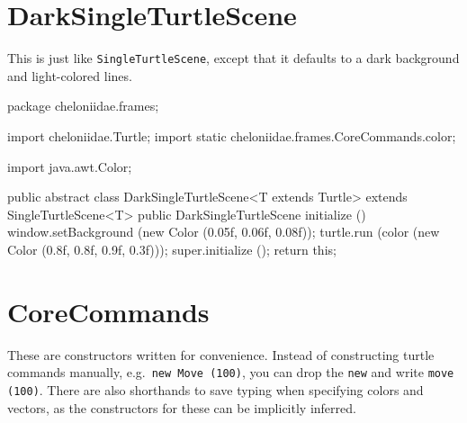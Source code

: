\documentclass{report}
\begin{document}
\section {DarkSingleTurtleScene} \label{sec:darksingleturtlescene}
      This is just like {\tt SingleTurtleScene}, except that it defaults to a dark background and light-colored lines.
  
\begin{javacode}
package cheloniidae.frames;

import cheloniidae.Turtle;
import static cheloniidae.frames.CoreCommands.color;

import java.awt.Color;

public abstract class DarkSingleTurtleScene<T extends Turtle> extends SingleTurtleScene<T> {
  public DarkSingleTurtleScene initialize () {
    window.setBackground (new Color (0.05f, 0.06f, 0.08f));
    turtle.run (color (new Color (0.8f, 0.8f, 0.9f, 0.3f)));
    super.initialize ();
    return this;
  }
}
\end{javacode}

\section {CoreCommands} \label{sec:corecommands}
      These are constructors written for convenience. Instead of constructing turtle commands manually, e.g.~\verb|new Move (100)|, you can drop the {\tt new}
      and write \verb|move (100)|. There are also shorthands to save typing when specifying colors and vectors, as the constructors for these can be implicitly
      inferred.
\end{document}
